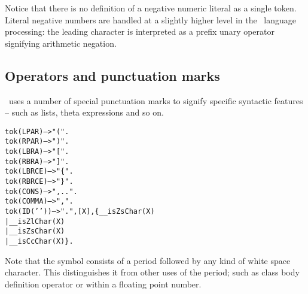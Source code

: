 \begin{aside}
Notice that there is no definition of a negative numeric literal as a single token. Literal negative numbers are handled at a slightly higher level in the \go\ language processing: the leading \q{-} character is interpreted as a prefix unary operator signifying arithmetic negation.
\end{aside}

\subsection{Operators and punctuation marks}

\go\ uses a number of special punctuation marks to signify specific syntactic features -- such as lists, theta expressions and so on.
\begin{alltt}
tok(LPAR) --> "(".
tok(RPAR) --> ")".
tok(LBRA) --> "[".
tok(RBRA) --> "]".
tok(LBRCE) --> "\{".
tok(RBRCE) --> "\}".
tok(CONS) --> ",..".
tok(COMMA) --> ",".
tok(ID('\dotspace{}')) --> ".", [X],\{ \_\_isZsChar(X)
                        | \_\_isZlChar(X)
                        | \_\_isZsChar(X)
                        | \_\_isCcChar(X)\}.
\end{alltt}

\noindent
Note that the \dotspace symbol consists of a period followed by any kind of white space character. This distinguishes it from other uses of the period; such as class body definition operator  or within a floating point number.

